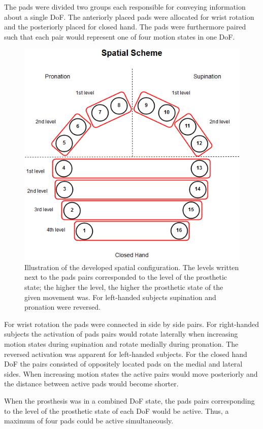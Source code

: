 The pads were divided two groups each responsible for conveying information about a single DoF. The anteriorly placed pads were allocated for wrist rotation and the posteriorly placed for closed hand. The pads were furthermore paired such that each pair would represent one of four motion states in one DoF. 
\begin{figure}[h]                 
	\includegraphics[width=.8\textwidth]{figures/El_array_spatial}  
	\caption{Illustration of the developed spatial configuration. The levels written next to the pads pairs corresponded to the level of the prosthetic state; the higher the level, the higher the prosthetic state of the given movement was. For left-handed subjects supination and pronation were reversed.}
	\label{fig:pa:spatial} 
\end{figure}
For wrist rotation the pads were connected in side by side pairs. For right-handed subjects the activation of pads pairs would rotate laterally when increasing motion states during supination and rotate medially during pronation. The reversed activation was apparent for left-handed subjects. For the closed hand DoF the pairs consisted of oppositely located pads on the medial and lateral sides. When increasing motion states the active pairs would move posteriorly and the distance between active pads would become shorter. 

When the prosthesis was in a combined DoF state, the pads pairs corresponding to the level of the prosthetic state of each DoF would be active. Thus, a maximum of four pads could be active simultaneously. 



